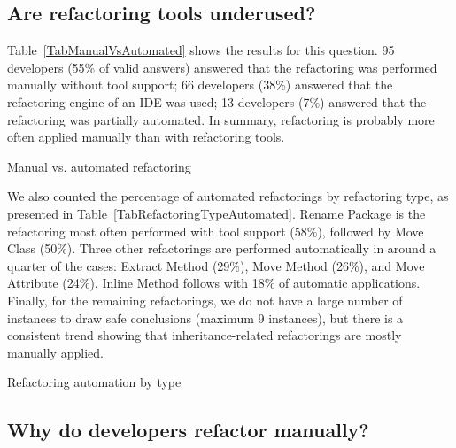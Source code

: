 \subsection{Are refactoring tools underused?}
\label{SecRefactoringToolsUnderused}

Table~\ref{TabManualVsAutomated} shows the results for this question.
95 developers (55\% of valid answers) answered that the refactoring was performed manually without tool support;
66 developers (38\%) answered that the refactoring engine of an IDE was used;
13 developers (7\%) answered that the refactoring was partially automated. 
In summary, refactoring is probably more often applied manually than with refactoring tools.

\begin{table}[htbp]
\centering
\renewcommand{\arraystretch}{1.2}
\caption{Manual vs. automated refactoring}
\label{TabManualVsAutomated}

\end{table}


We also counted the percentage of automated refactorings by refactoring type, as presented in Table~\ref{TabRefactoringTypeAutomated}.
{\textsc Rename Package} is the refactoring most often performed with tool support (58\%), followed by {\textsc Move Class} (50\%).
Three other refactorings are performed automatically in around a quarter of the cases: {\textsc Extract Method} (29\%), {\textsc Move Method} (26\%), and {\textsc Move Attribute} (24\%).
{\textsc Inline Method} follows with 18\% of automatic applications.
Finally, for the remaining refactorings, we do not have a large number of instances to draw safe conclusions (maximum 9 instances),
but there is a consistent trend showing that inheritance-related refactorings are mostly manually applied.

\begin{table}[htbp]
\centering
\renewcommand{\arraystretch}{1.2}
\caption{Refactoring automation by type}
\label{TabRefactoringTypeAutomated}

\end{table}



\subsection{Why do developers refactor manually?}
\label{SecReasonForManualRefactoring}

